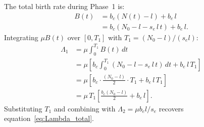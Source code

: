 \documentclass[12pt]{article}
\newcommand{\Nzero}{N_0}
\newcommand{\sEdge}{s_e}
\newcommand{\bEdge}{b_e}
\newcommand{\bCore}{b_c}
\begin{document}
The total birth rate during Phase~1 is:
\begin{align}
    B(t) &= \bCore (N(t) - l) + \bEdge\, l \\
         &= \bCore (\Nzero - l - \sEdge\, l\, t) + \bEdge\, l.
\end{align}
Integrating $\mu B(t)$ over $[0, T_1]$ with $T_1 = (\Nzero - l)/(\sEdge l)$:
\begin{align}
    \Lambda_1 &= \mu\int_0^{T_1} B(t)\, dt \\
    &= \mu\left[\bCore\int_0^{T_1}(\Nzero - l - \sEdge\, l\, t)\, dt
       + \bEdge\, l\, T_1\right] \\
    &= \mu\left[\bCore \cdot \frac{(\Nzero - l)}{2}\cdot T_1
       + \bEdge\, l\, T_1\right] \\
    &= \mu\, T_1\left[\frac{\bCore(\Nzero - l)}{2} + \bEdge\, l\right].
\end{align}
Substituting $T_1$ and combining with $\Lambda_2 = \mu \bEdge l / \sEdge$
recovers equation~\eqref{eq:Lambda_total}.



\end{document}
